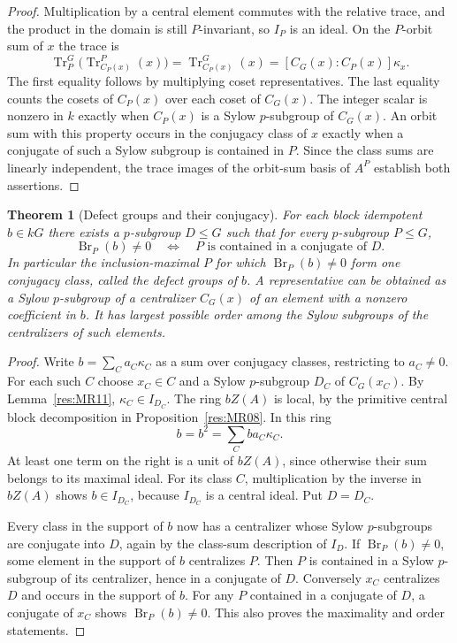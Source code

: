 \documentclass[11pt,oneside,openany]{book}
\newtheorem{theorem}{Theorem}[chapter]
\theoremstyle{definition}
\theoremstyle{remark}
\begin{document}
\begin{proof}
Multiplication by a central element commutes with the
relative trace, and the product in the domain is still
\(P\)-invariant, so \(I_P\) is an ideal. On the \(P\)-orbit
sum of \(x\) the trace is
\[
 \operatorname{Tr}_{P}^{G}
    \bigl(\operatorname{Tr}_{C_P(x)}^P(x)\bigr)
  = \operatorname{Tr}_{C_P(x)}^G(x)
  = [C_G(x):C_P(x)]\kappa_x .
\]
The first equality follows by multiplying coset
representatives. The last equality counts the cosets of
\(C_P(x)\) over each coset of \(C_G(x)\).
The integer scalar is nonzero in \(k\) exactly when
\(C_P(x)\) is a Sylow \(p\)-subgroup of \(C_G(x)\).
An orbit sum with this property occurs in the conjugacy
class of \(x\) exactly when a conjugate of such a Sylow
subgroup is contained in \(P\). Since the class sums are
linearly independent, the trace images of the orbit-sum
basis of \(A^P\) establish both assertions.
\end{proof}

\begin{theorem}[Defect groups and their conjugacy]
\label{res:MR12}
For each block idempotent \(b\in kG\) there exists a
\(p\)-subgroup \(D\leq G\) such that for every \(p\)-subgroup
\(P\leq G\),
\[
 \operatorname{Br}_P(b)\ne0
 \quad\Longleftrightarrow\quad
 P\text{ is contained in a conjugate of }D .
\]
In particular the inclusion-maximal \(P\) for which
\(\operatorname{Br}_P(b)\ne0\) form one conjugacy class,
called the defect groups of \(b\). A representative can
be obtained as a Sylow \(p\)-subgroup of a centralizer
\(C_G(x)\) of an element with a nonzero coefficient in \(b\).
It has largest possible order among the Sylow subgroups of
the centralizers of such elements.
\end{theorem}

\begin{proof}
Write \(b=\sum_C a_C\kappa_C\) as a sum over conjugacy classes,
restricting to \(a_C\ne0\). For each such \(C\) choose
\(x_C\in C\) and a Sylow \(p\)-subgroup \(D_C\) of \(C_G(x_C)\).
By Lemma~\ref{res:MR11}, \(\kappa_C\in I_{D_C}\).
The ring \(b Z(A)\) is local, by the primitive central block
decomposition in Proposition~\ref{res:MR08}. In this ring
\[
 b=b^2=\sum_C b a_C\kappa_C .
\]
At least one term on the right is a unit of \(bZ(A)\),
since otherwise their sum belongs to its maximal ideal.
For its class \(C\), multiplication by the inverse in \(bZ(A)\)
shows \(b\in I_{D_C}\), because \(I_{D_C}\) is a central
ideal. Put \(D=D_C\).

Every class in the support of \(b\) now has a centralizer
whose Sylow \(p\)-subgroups are conjugate into \(D\), again
by the class-sum description of \(I_D\).
If \(\operatorname{Br}_P(b)\ne0\), some element in the support
of \(b\) centralizes \(P\). Then \(P\) is contained in a Sylow
\(p\)-subgroup of its centralizer, hence in a conjugate of
\(D\). Conversely \(x_C\) centralizes \(D\) and occurs in
the support of \(b\). For any \(P\) contained in a conjugate
of \(D\), a conjugate of \(x_C\) shows
\(\operatorname{Br}_P(b)\ne0\). This also proves the
maximality and order statements.
\end{proof}
\end{document}
